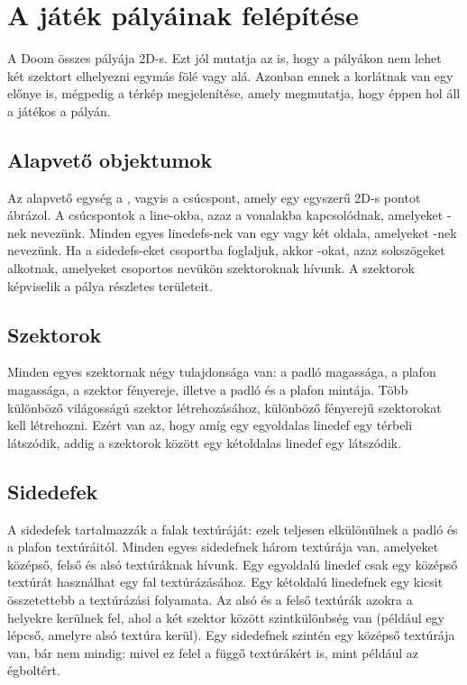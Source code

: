 \documentclass{thesis-ekf}
\theoremstyle{definition}
\theoremstyle{remark}
\begin{document}
\section{A játék pályáinak felépítése}

A Doom összes pályája 2D-s. Ezt jól mutatja az is, hogy a pályákon nem lehet két
szektort elhelyezni egymás fölé vagy alá. Azonban ennek a korlátnak van egy
előnye is, mégpedig a térkép megjelenítése, amely megmutatja, hogy éppen hol áll
a játékos a pályán.

\subsection{Alapvető objektumok}

Az alapvető egység a , vagyis a csúcspont, amely egy egyszerű
2D-s pontot ábrázol. A csúcspontok a line-okba, azaz a vonalakba kapcsolódnak,
amelyeket -nek nevezünk. Minden egyes linedefs-nek van egy vagy
két oldala, amelyeket -nek nevezünk. Ha a sidedefs-eket
csoportba foglaljuk, akkor -okat, azaz sokszögeket alkotnak,
amelyeket csoportos nevükön szektoroknak hívunk. A szektorok képviselik a pálya
részletes területeit.

\subsection{Szektorok}

Minden egyes szektornak négy tulajdonsága van: a padló magassága, a plafon
magassága, a szektor fényereje, illetve a padló és a plafon mintája. Több
különböző világosságú szektor létrehozásához, különböző fényerejű szektorokat
kell létrehozni. Ezért van az, hogy amíg egy egyoldalas linedef egy térbeli
 látszódik, addig a szektorok között egy kétoldalas linedef egy
 látszódik.

\subsection{Sidedefek}

A sidedefek tartalmazzák a falak textúráját: ezek teljesen elkülönülnek a padló
és a plafon textúráitól. Minden egyes sidedefnek három textúrája van, amelyeket
középső, felső és alsó textúráknak hívunk. Egy egyoldalú linedef csak egy
középső textúrát használhat egy fal textúrázásához. Egy kétoldalú linedefnek egy
kicsit összetettebb a textúrázási folyamata. Az alsó és a felső textúrák azokra
a helyekre kerülnek fel, ahol a két szektor között szintkülönbség van (például
egy lépcső, amelyre alsó textúra kerül). Egy sidedefnek szintén egy középső
textúrája van, bár nem mindig: mivel ez felel a függő textúrákért is, mint
például az égboltért.
\end{document}
